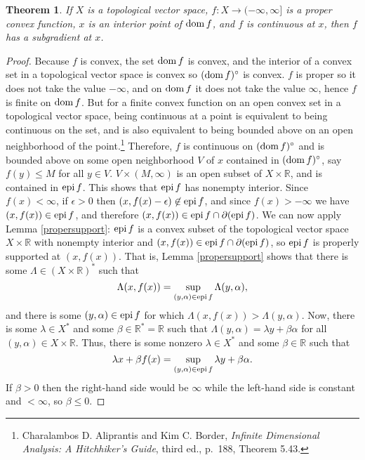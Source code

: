 \documentclass{article}
\newcommand{\epi}{\ensuremath\mathrm{epi}\,}
\newcommand{\dom}{\ensuremath\mathrm{dom}\,}
\newtheorem{theorem}{Theorem}
\theoremstyle{definition}
\begin{document}
\begin{theorem}
If $X$ is a topological vector space, $f:X \to (-\infty,\infty]$ is a proper convex function, $x$ is an interior point of $\dom f$, and 
$f$ is  continuous at $x$, then $f$ has a subgradient at $x$. 
\label{nonempty}
\end{theorem}
\begin{proof}
Because $f$ is convex, the set $\dom f$ is convex, and the interior of a convex set in a topological vector space is convex so $(\dom f)^\circ$ is convex.
$f$ is proper so it does not take the value $-\infty$, and on $\dom f$ it does not take the value $\infty$, hence $f$ is finite on $\dom f$. 
But for a finite convex function on an open convex set in a topological vector space, being continuous at a point
is equivalent to being continuous on the set, and is also equivalent to being bounded above on an open neighborhood of the point.\footnote{Charalambos D. Aliprantis and Kim C. Border, {\em Infinite Dimensional Analysis: A Hitchhiker's Guide}, third ed., p.~188, Theorem 5.43.}
Therefore, $f$ is continuous on $(\dom f)^\circ$ and is bounded above on some open neighborhood $V$ of $x$ contained in $(\dom f)^\circ$, say $f(y) \leq M$ for all $y \in V$.
 $V \times (M,\infty)$ is an open subset of $X \times \mathbb{R}$, and is contained in $\epi f$. This shows  that $\epi f$ has nonempty interior.
Since $f(x)<\infty$, if $\epsilon>0$ then $(x, f(x)-\epsilon) \not \in \epi f$, and since $f(x)>-\infty$ we have $(x,f(x)) \in \epi f$, and therefore
$(x,f(x)) \in \epi f \cap \partial (\epi f)$.
We can now apply Lemma \ref{propersupport}: $\epi f$ is a convex subset of the topological vector space $X \times \mathbb{R}$ with nonempty interior   and $(x,f(x)) \in
\epi f \cap \partial (\epi f)$, so $\epi f$ is properly supported at $(x,f(x))$. That is, Lemma \ref{propersupport} shows that
there is some  $\Lambda \in (X \times \mathbb{R})^*$ such that
\[
\Lambda (x,f(x)) = \sup_{(y,\alpha) \in \epi f} \Lambda (y,\alpha),
\]
and there is some $(y,\alpha) \in \epi f$ for which $\Lambda (x,f(x)) > \Lambda (y,\alpha)$. Now, there is some $\lambda \in X^*$ and some
$\beta \in \mathbb{R}^* = \mathbb{R}$ such that $\Lambda (y,\alpha) = \lambda y  + \beta \alpha$ for all $(y,\alpha) \in X \times \mathbb{R}$.
Thus, there is some nonzero $\lambda \in X^*$ and some $\beta \in \mathbb{R}$ such that
\[
\lambda x + \beta f(x) = \sup_{(y,\alpha) \in \epi f} \lambda y + \beta \alpha.
\]
If $\beta>0$ then the right-hand side
would be $\infty$ while the left-hand side is constant and $<\infty$, so $\beta \leq 0$. 

\end{proof}
\end{document}
